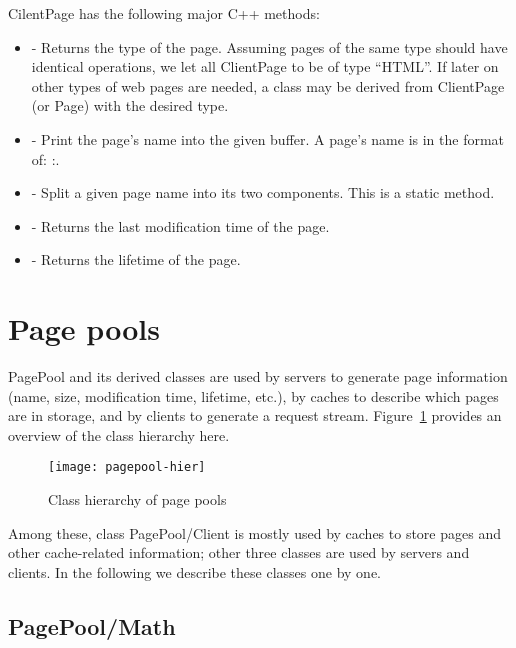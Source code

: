 CilentPage has the following major C++ methods: 

\begin{itemize}
\item {} - Returns the type of the page. Assuming pages of
  the same type should have identical operations, we let all
  ClientPage to be of type ``HTML''. If later on other types of web
  pages are needed, a class may be derived from ClientPage (or Page)
  with the desired type. 
\item {} - Print the page's name into the given
  buffer. A page's name is in the format of:
  :. 
\item {} - Split a given
  page name into its two components. This is a static method. 
\item {} - Returns the last modification time of the page.
\item {} - Returns the lifetime of the page. 
\end{itemize}


\section{Page pools}
\label{sec:webcache-pagepool}

PagePool and its derived classes are used by servers to generate page
information (name, size, modification time, lifetime, etc.), by caches
to describe which pages are in storage, and by clients to generate a
request stream. Figure~\ref{fig:pagepool-hier} provides an overview of
the class hierarchy here. 

\begin{figure}[tb]
  \begin{center}
    \texttt{[image: pagepool-hier]}
    \caption{Class hierarchy of page pools}
    \label{fig:pagepool-hier}
  \end{center}
\end{figure}

Among these, class PagePool/Client is mostly used by caches to store
pages and other cache-related information; other three classes are
used by servers and clients. In the following we describe these
classes one by one.

\subsection{PagePool/Math}

